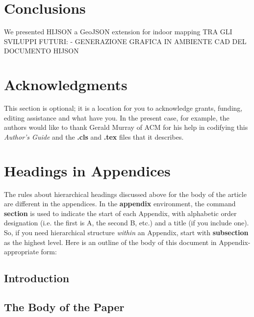 \documentclass{sig-alternate}
\begin{document}
\section{Conclusions}\label{conclusions}

We presented HIJSON a GeoJSON extension for indoor mapping TRA GLI
SVILUPPI FUTURI: - GENERAZIONE GRAFICA IN AMBIENTE CAD DEL DOCUMENTO
HIJSON

\section{Acknowledgments}
This section is optional; it is a location for you
to acknowledge grants, funding, editing assistance and
what have you.  In the present case, for example, the
authors would like to thank Gerald Murray of ACM for
his help in codifying this \emph{Author's Guide}
and the \textbf{.cls} and \textbf{.tex} files that it describes.

%

%
%
\appendix
\section{Headings in Appendices}
The rules about hierarchical headings discussed above for
the body of the article are different in the appendices.
In the \textbf{appendix} environment, the command
\textbf{section} is used to
indicate the start of each Appendix, with alphabetic order
designation (i.e. the first is A, the second B, etc.) and
a title (if you include one).  So, if you need
hierarchical structure
\emph{within} an Appendix, start with \textbf{subsection} as the
highest level. Here is an outline of the body of this
document in Appendix-appropriate form:
\subsection{Introduction}
\subsection{The Body of the Paper}
\end{document}
